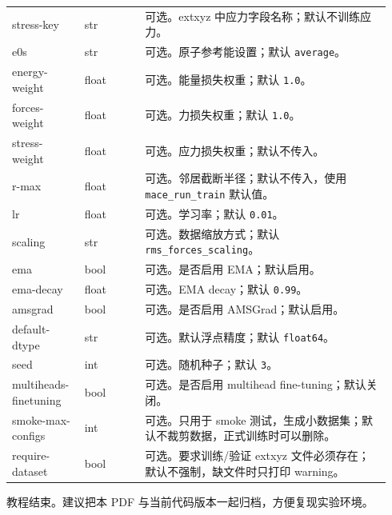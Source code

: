 \documentclass[11pt,a4paper]{article}
\begin{document}
\begin{longtable}{@{}>{\ttfamily\small\raggedright\arraybackslash}p{0.18\linewidth}>{\ttfamily\small\raggedright\arraybackslash}p{0.15\linewidth}>{\raggedright\arraybackslash}p{0.61\linewidth}@{}}
stress-key & str & 可选。extxyz 中应力字段名称；默认不训练应力。 \\
e0s & str & 可选。原子参考能设置；默认 \texttt{average}。 \\
energy-weight & float & 可选。能量损失权重；默认 \texttt{1.0}。 \\
forces-weight & float & 可选。力损失权重；默认 \texttt{1.0}。 \\
stress-weight & float & 可选。应力损失权重；默认不传入。 \\
r-max & float & 可选。邻居截断半径；默认不传入，使用 \texttt{mace\_run\_train} 默认值。 \\
lr & float & 可选。学习率；默认 \texttt{0.01}。 \\
scaling & str & 可选。数据缩放方式；默认 \texttt{rms\_forces\_scaling}。 \\
ema & bool & 可选。是否启用 EMA；默认启用。 \\
ema-decay & float & 可选。EMA decay；默认 \texttt{0.99}。 \\
amsgrad & bool & 可选。是否启用 AMSGrad；默认启用。 \\
default-dtype & str & 可选。默认浮点精度；默认 \texttt{float64}。 \\
seed & int & 可选。随机种子；默认 \texttt{3}。 \\
multiheads-\allowbreak{}finetuning & bool & 可选。是否启用 multihead fine-tuning；默认关闭。 \\
smoke-\allowbreak{}max-\allowbreak{}configs & int & 可选。只用于 smoke 测试，生成小数据集；默认不裁剪数据，正式训练时可以删除。 \\
require-\allowbreak{}dataset & bool & 可选。要求训练/验证 extxyz 文件必须存在；默认不强制，缺文件时只打印 warning。 \\
\bottomrule
\end{longtable}

\vfill
\begin{center}
\textcolor{lmgreen}{\textsf{教程结束。建议把本 PDF 与当前代码版本一起归档，方便复现实验环境。}}
\end{center}
\end{document}
